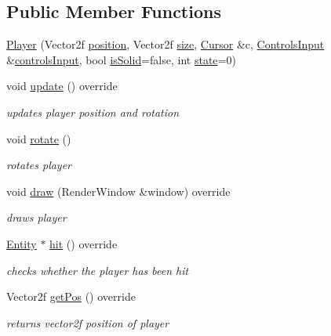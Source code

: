 \subsection*{Public Member Functions}
\begin{DoxyCompactItemize}
\item 
\hyperlink{class_player_afa77ee030e5d4e529de48e678800a173}{Player} (Vector2f \hyperlink{class_entity_a6af9d6498134ad0906011778bc5736db}{position}, Vector2f \hyperlink{class_entity_ae9a0a364c85f91ade5088b3610131417}{size}, \hyperlink{class_cursor}{Cursor} \&c, \hyperlink{struct_controls_input}{Controls\+Input} \&\hyperlink{classcontrols_input}{controls\+Input}, bool \hyperlink{class_entity_af1b0754c9d5f4afa73834b23c6437101}{is\+Solid}=false, int \hyperlink{class_entity_a4edd9cc2506add0d9e27fade0bf957e8}{state}=0)
\item 
void \hyperlink{class_player_a6912bb6e48efb5845d59f0f4582827ef}{update} () override
\begin{DoxyCompactList}\small\item\em updates player position and rotation \end{DoxyCompactList}\item 
void \hyperlink{class_player_ad39abceb9ff5c7c189010f87d6b46dea}{rotate} ()
\begin{DoxyCompactList}\small\item\em rotates player \end{DoxyCompactList}\item 
void \hyperlink{class_player_a27ca9082a531285731af05f9395ffee8}{draw} (Render\+Window \&window) override
\begin{DoxyCompactList}\small\item\em draws player \end{DoxyCompactList}\item 
\hyperlink{class_entity}{Entity} $\ast$ \hyperlink{class_player_a089d9293cc3be7e5d6d7c89b49538134}{hit} () override
\begin{DoxyCompactList}\small\item\em checks whether the player has been hit \end{DoxyCompactList}\item 
Vector2f \hyperlink{class_player_a59cfaac9d09b12a290d2e89ca656be49}{get\+Pos} () override
\begin{DoxyCompactList}\small\item\em returns vector2f position of player \end{DoxyCompactList}\item 

\end{DoxyCompactItemize}
